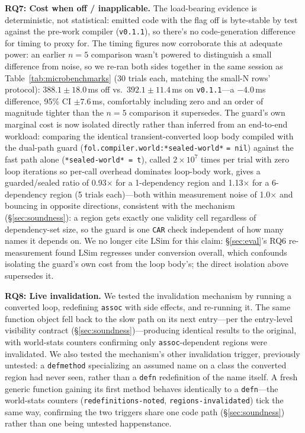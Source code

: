 \documentclass[sigplan,review,anonymous]{acmart}
\begin{document}
\textbf{RQ7: Cost when off / inapplicable.} The load-bearing evidence is deterministic, not statistical: emitted code with the flag off is byte-stable by test against the pre-work compiler (\texttt{v0.1.1}), so there's no code-generation difference for timing to proxy for. The timing figures now corroborate this at adequate power: an earlier $n=5$ comparison wasn't powered to distinguish a small difference from noise, so we re-ran both sides together in the same session as Table~\ref{tab:microbenchmarks} (30 trials each, matching the small-N rows' protocol): $388.1\pm18.0$\,ms off vs.\ $392.1\pm11.4$\,ms on \texttt{v0.1.1}---a $-4.0$\,ms difference, 95\% CI $\pm7.6$\,ms, comfortably including zero and an order of magnitude tighter than the $n=5$ comparison it supersedes. The guard's own marginal cost is now isolated directly rather than inferred from an end-to-end workload: comparing the identical transient-converted loop body compiled with the dual-path guard (\texttt{fol.compiler.world:*sealed-world*} \texttt{= nil}) against the fast path alone (\texttt{*sealed-world* = t}), called $2\times10^7$ times per trial with zero loop iterations so per-call overhead dominates loop-body work, gives a guarded/sealed ratio of 0.93$\times$ for a 1-dependency region and 1.13$\times$ for a 6-dependency region (5 trials each)---both within measurement noise of 1.0$\times$ and bouncing in opposite directions, consistent with the mechanism (§\ref{sec:soundness}): a region gets exactly one validity cell regardless of dependency-set size, so the guard is one \texttt{CAR} check independent of how many names it depends on. We no longer cite LSim for this claim: §\ref{sec:eval}'s RQ6 re-measurement found LSim regresses under conversion overall, which confounds isolating the guard's own cost from the loop body's; the direct isolation above supersedes it.

\textbf{RQ8: Live invalidation.} We tested the invalidation mechanism by running a converted loop, redefining \texttt{assoc} with side effects, and re-running it. The same function object fell back to the slow path on its next entry---per the entry-level visibility contract (§\ref{sec:soundness})---producing identical results to the original, with world-stats counters confirming only \texttt{assoc}-dependent regions were invalidated. We also tested the mechanism's other invalidation trigger, previously untested: a \texttt{defmethod} specializing an assumed name on a class the converted region had never seen, rather than a \texttt{defn} redefinition of the name itself. A fresh generic function gaining its first method behaves identically to a \texttt{defn}---the world-stats counters (\texttt{redefinitions-noted}, \texttt{regions-invalidated}) tick the same way, confirming the two triggers share one code path (§\ref{sec:soundness}) rather than one being untested happenstance.
\end{document}
